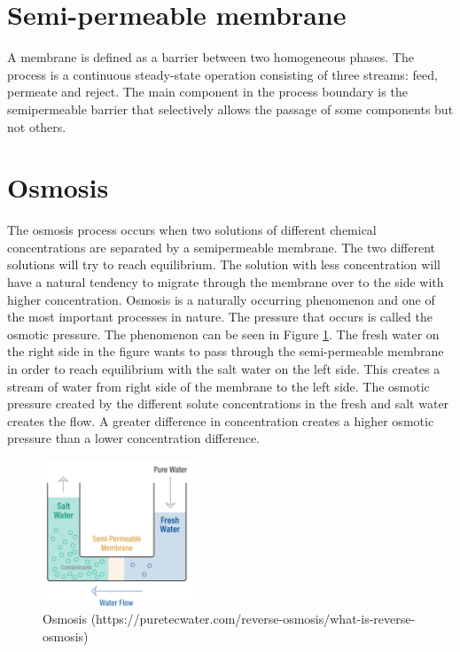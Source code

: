 
\section{Semi-permeable membrane}
\label{sec:membrane}
A membrane is defined as a barrier between two homogeneous phases. The process is a continuous steady-state operation consisting of three streams: feed, permeate and reject. The main component in the process boundary is the semipermeable barrier that selectively allows the passage of some components but not others. \cite{2}

\section{Osmosis} 
\label{sec:osmosis}
The osmosis process occurs when two solutions of different chemical concentrations are separated by a semipermeable membrane. The two different solutions will try to reach equilibrium. The solution with less concentration will have a natural tendency to migrate through the membrane over to the side with higher concentration.  
Osmosis is a naturally occurring phenomenon and one of the most important processes in nature. The pressure that occurs is called the osmotic pressure. The phenomenon can be seen in Figure \ref{fig:osmosis}. The fresh water on the right side in the figure wants to pass through the semi-permeable membrane in order to reach equilibrium with the salt water on the left side. This creates a stream of water from right side of the membrane to the left side. The osmotic pressure created by the different solute concentrations in the fresh and salt water creates the flow. A greater difference in concentration creates a higher osmotic pressure than a lower concentration difference.

\begin{figure}[h]
    \centering
    \includegraphics[width=0.4\textwidth]{Osmosis}
    \caption{Osmosis (https://puretecwater.com/reverse-osmosis/what-is-reverse-osmosis)}
    \label{fig:osmosis}
\end{figure}

